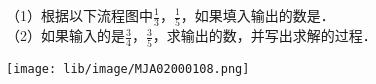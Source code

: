 （1）根据以下流程图中$\frac{1}{3}$，$\frac{1}{5}$，如果填入输出的数是\key{\hspace{4em}}．\\
（2）如果输入的是$\frac{3}{4}$，$\frac{3}{5}$，求输出的数，并写出求解的过程． \\

\begin{minipage}[b]{0.65\linewidth}

\end{minipage}
\hfill
\begin{minipage}[b]{0.35\linewidth}
\begin{center}
	\texttt{[image: lib/image/MJA02000108.png]}
	\vspace{0.5cm}
\end{center}
\end{minipage}